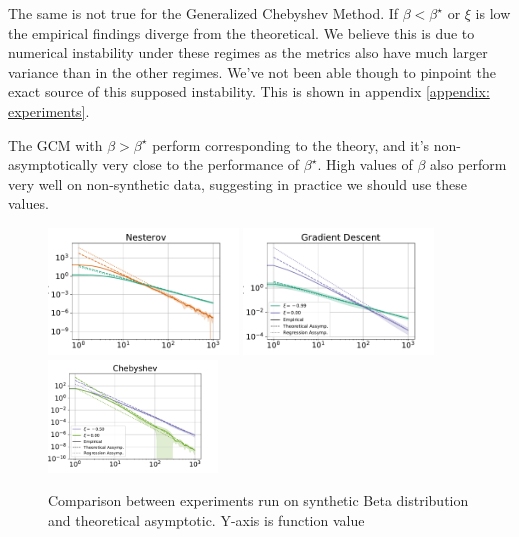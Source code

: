 \documentclass{article}
\begin{document}
The same is not true for the Generalized Chebyshev Method. If $\beta<\beta^\star$ or $\xi$ is low the empirical findings diverge from the theoretical. We believe this is due to numerical instability under these regimes as the metrics also have  much larger variance than in the other regimes. We've not been able though to pinpoint the exact source of this supposed instability. This is shown in appendix \ref{appendix: experiments}. 


The GCM with  $\beta>\beta^\star$ perform corresponding to the theory, and it's non-asymptotically very close to the performance of $\beta^\star$. High values of $\beta$ also perform very well on non-synthetic data, suggesting in practice we should use these values.

\begin{figure}[H]
    \centering
    \includegraphics[width=0.45\textwidth]{final_imgs/nesterov.pdf}
    \includegraphics[width= 0.45\textwidth]{final_imgs/gd.pdf}\\
        \includegraphics[width= 0.4\textwidth]{final_imgs/chebyshev.pdf}

    \caption{Comparison between experiments run on synthetic Beta distribution and theoretical asymptotic. Y-axis is function value }
    \label{fig: last figure}
\end{figure}
\end{document}
